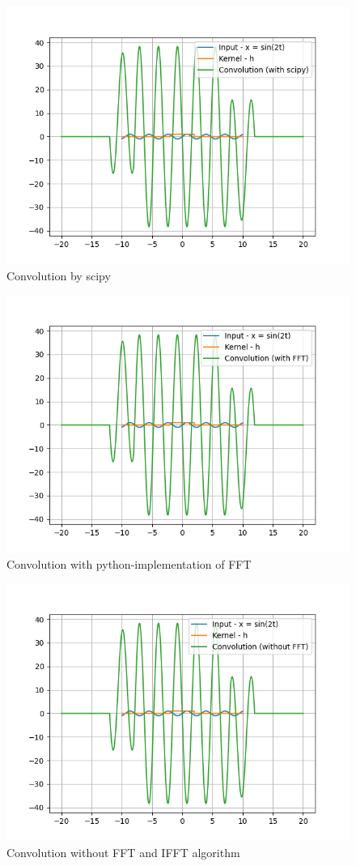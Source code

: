 \documentclass[12pt]{article}
\begin{document}
\begin{figure}[H]
    \centering
    \includegraphics[width=0.7\linewidth]{figs/sci.png}
    \caption{Convolution by scipy}
\end{figure}

\begin{figure}[H]
    \centering
    \includegraphics[width=0.7\linewidth]{figs/FFT.png}
    \caption{Convolution with python-implementation of FFT}
\end{figure}

\begin{figure}[H]
    \centering
    \includegraphics[width=0.7\linewidth]{figs/base.png}
    \caption{Convolution without FFT and IFFT algorithm}
\end{figure}
\end{document}
